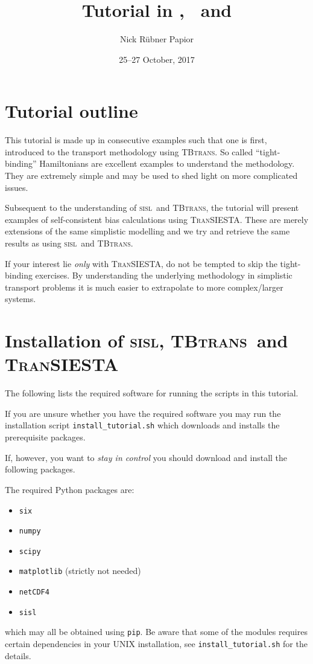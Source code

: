 \documentclass[10pt]{article}
\title{Tutorial in \sisl, \tbt\ and \ts}
\author{Nick R\"ubner Papior}
\date{25--27 October, 2017}
\newcommand\sisl{\textsc{sisl}}
\newcommand\tbt{\textsc{TBtrans}}
\newcommand\ts{\textsc{TranSIESTA}}
\newcommand\script[1]{\texttt{#1}}
\newcounter{example}
\begin{document}
\maketitle

\tableofcontents


\section{Tutorial outline}

This tutorial is made up in consecutive examples such that one is first, introduced to the
transport methodology using \tbt. So called ``tight-binding'' Hamiltonians are excellent
examples to understand the methodology. They are extremely simple and may be used to shed
light on more complicated issues.

Subsequent to the understanding of \sisl\ and \tbt, the tutorial will present examples of
self-consistent bias calculations using \ts. These are merely extensions of the same
simplistic modelling and we try and retrieve the same results as using \sisl\ and \tbt.

If your interest lie \emph{only} with \ts, do not be tempted to skip the tight-binding
exercises. By understanding the underlying methodology in simplistic transport problems it
is much easier to extrapolate to more complex/larger systems.



\section{Installation of \sisl, \tbt\ and \ts}

The following lists the required software for running the scripts in this tutorial.

If you are unsure whether you have the required software you may run the installation
script \script{install\_tutorial.sh} which downloads and installs the prerequisite
packages. 

If, however, you want to \emph{stay in control} you should download and install
the following packages.

The required Python packages are:
\begin{itemize}
  \itemsep=0pt
  \parskip=0pt
  \item \script{six}
  \item \script{numpy}
  \item \script{scipy}
  \item \script{matplotlib} (strictly not needed)
  \item \script{netCDF4}
  \item \script{sisl}
\end{itemize}
which may all be obtained using \script{pip}. Be aware that some of the modules requires
certain dependencies in your UNIX installation, see \script{install\_tutorial.sh} for the
details.
\end{document}
